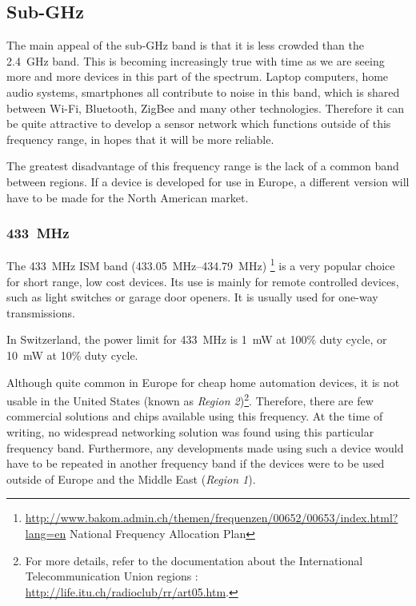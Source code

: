 \subsection{Sub-GHz}

The main appeal of the sub-GHz band is that it is less crowded than the
\SI{2.4}{GHz} band. This is becoming increasingly true with time as we are
seeing more and more devices in this part of the spectrum. Laptop computers,
home audio systems, smartphones all contribute to noise in this band, which is
shared between Wi-Fi, Bluetooth, ZigBee and many other technologies. Therefore
it can be quite attractive to develop a sensor network which functions outside
of this frequency range, in hopes that it will be more reliable.

The greatest disadvantage of this frequency range is the lack of a common band
between regions. If a device is developed for use in Europe, a different version
will have to be made for the North American market.


\subsubsection{\SI{433}{MHz}}

The \SI{433}{MHz} ISM band (\SIrange{433.05}{434.79}{MHz})
\footnote{\url{http://www.bakom.admin.ch/themen/frequenzen/00652/00653/index.html?lang=en}
National Frequency Allocation Plan} is a very popular choice for short range,
low cost devices. Its use is mainly for remote controlled devices, such as light
switches or garage door openers. It is usually used for one-way transmissions.

In Switzerland, the power limit for \SI{433}{MHz} is \SI{1}{mW} at 100\% duty
cycle, or \SI{10}{mW} at 10\% duty cycle.


Although quite common in Europe for cheap home automation devices, it is not
usable in the United States (known as \emph{Region
2})\footnote{For more details, refer to the documentation about the
  International Telecommunication Union regions
  : \url{http://life.itu.ch/radioclub/rr/art05.htm}.}.
Therefore, there are few commercial solutions and chips available using this
frequency. At the time of writing, no widespread networking solution was found
using this particular frequency band.  Furthermore, any developments made using
such a device would have to be repeated in another frequency band if the devices
were to be used outside of Europe and the Middle East (\emph{Region 1}).

